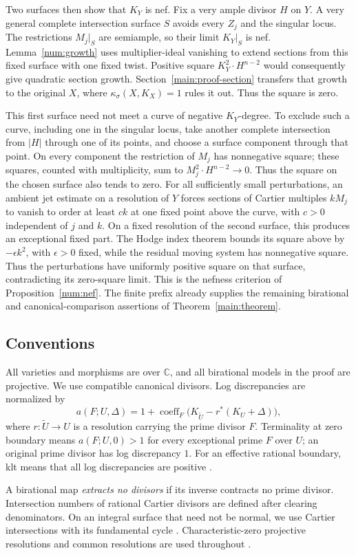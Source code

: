 Two surfaces then show that \(K_Y\) is nef. Fix a very ample divisor
\(H\) on \(Y\). A very general complete intersection surface \(S\)
avoids every \(Z_j\) and the singular locus. The restrictions
\(M_j|_S\) are semiample, so their limit \(K_Y|_S\) is nef.
Lemma~\ref{num:growth} uses multiplier-ideal vanishing to extend sections
from this fixed surface with one fixed twist. Positive square
\(K_Y^2\cdot H^{n-2}\) would consequently give quadratic section growth.
Section~\ref{main:proof-section} transfers that growth to the original
\(X\), where \(\kappa_\sigma(X,K_X)=1\) rules it out. Thus the square
is zero.

This first surface need not meet a curve of negative \(K_Y\)-degree.
To exclude such a curve, including one in the singular locus, take another
complete intersection from \(|H|\) through one of its points, and choose
a surface component through that point. On every component the restriction
of \(M_j\) has nonnegative square; these squares, counted with
multiplicity, sum to \(M_j^2\cdot H^{n-2}\to0\). Thus the square on
the chosen surface also tends to zero.
For all sufficiently small perturbations, an ambient jet estimate on a
resolution of \(Y\) forces sections of Cartier multiples \(kM_j\) to vanish to order at
least \(ck\) at one fixed point above the curve, with \(c>0\) independent
of \(j\) and \(k\). On a fixed resolution of the second surface, this
produces an exceptional fixed part. The Hodge index theorem bounds its
square above by \(-\epsilon k^2\), with \(\epsilon>0\) fixed, while
the residual moving system has nonnegative square. Thus the perturbations
have uniformly positive square on that surface, contradicting its
zero-square limit. This is the nefness
criterion of Proposition~\ref{num:nef}. The finite prefix already supplies
the remaining birational and canonical-comparison assertions of
Theorem~\ref{main:theorem}.

\subsection{Conventions}

All varieties and morphisms are over \(\mathbb C\), and all birational
models in the proof are projective. We use compatible canonical divisors.
Log discrepancies are normalized by
\[
a(F;U,\Delta)=1+\operatorname{coeff}_F
\bigl(K_{\widetilde U}-r^*(K_U+\Delta)\bigr),
\]
where \(r:\widetilde U\to U\) is a resolution carrying the prime
divisor \(F\). Terminality at zero boundary means
\(a(F;U,0)>1\) for every exceptional prime \(F\) over \(U\);
an original prime divisor has log discrepancy \(1\).
For an effective rational boundary, klt means that all log discrepancies
are positive \cite[Chapter~2]{KM98}.

A birational map \emph{extracts no divisors} if its inverse contracts no
prime divisor. Intersection numbers of rational Cartier divisors are defined
after clearing denominators. On an integral surface that need not be normal,
we use Cartier intersections with its fundamental cycle
\cite[Chapter~2]{Fulton98}. Characteristic-zero projective resolutions and
common resolutions are used throughout \cite{Hironaka64}.
